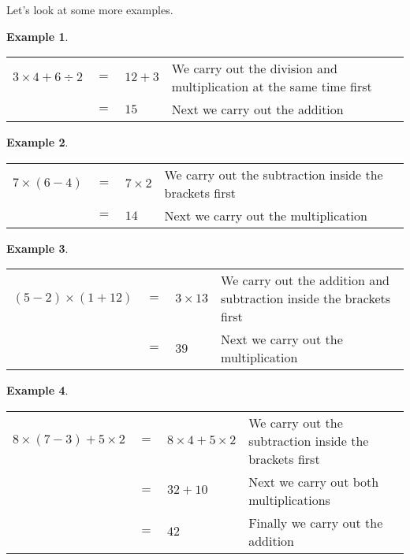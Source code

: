 \documentclass[11pt, oneside]{article}
\theoremstyle{definition}
\newtheorem{exmp}{Example}[section]
\begin{document}
Let's look at some more examples.

\begin{exmp} \end{exmp}
\begin{table}[H]
\begin{tabular}{p{2cm}p{0.5cm}p{2cm}p{11.5cm}}
$3\times 4 + 6\div 2 $ & $=$ & $12 + 3 $ & We carry out the division and multiplication at the same time first \\
 & $=$ & $15$ & Next we carry out the addition \\
\end{tabular}
\end{table}

\begin{exmp} \end{exmp}
\begin{table}[H]
\begin{tabular}{p{2cm}p{0.5cm}p{2cm}p{11.5cm}}
$7\times (6 - 4) $ & $=$ & $7\times2 $ & We carry out the subtraction inside the brackets first \\
 & $=$ & $14$ & Next we carry out the multiplication \\
\end{tabular}
\end{table}

\begin{exmp} \end{exmp}
\begin{table}[H]
\begin{tabular}{p{3cm}p{0.3cm}p{2cm}p{10.5cm}}
$(5-2)\times (1 +12) $ & $=$ & $3\times13 $ & We carry out the addition and subtraction inside the brackets first \\
 & $=$ & $39$ & Next we carry out the multiplication \\
\end{tabular}
\end{table}

\begin{exmp} \end{exmp}
\begin{table}[H]
\begin{tabular}{p{3cm}p{0.3cm}p{2cm}p{10.5cm}}
$8\times (7 - 3) +5\times 2 $ & $=$ & $8\times 4 + 5\times 2$ & We carry out the subtraction inside the brackets first \\
 & $=$ & $32 + 10$ & Next we carry out both multiplications \\
 & $=$ & $42 $ & Finally we carry out the addition \\
\end{tabular}
\end{table}
\end{document}
